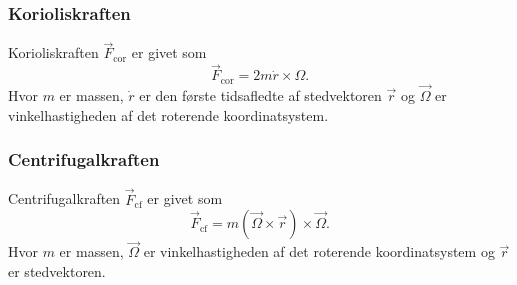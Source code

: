 \subsubsection{Korioliskraften}
Korioliskraften $\Vec{F}_{\text{cor}}$ er givet som
\[ 
\Vec{F}_{\text{cor}} = 2m \dot{r} \times \Omega
.\]
Hvor $m$ er massen, $\dot{r}$ er den første tidsafledte af stedvektoren $\Vec{r}$ og $\Vec{\Omega}$ er vinkelhastigheden af det roterende koordinatsystem.


\subsubsection{Centrifugalkraften}
Centrifugalkraften $\Vec{F}_{\text{cf}}$ er givet som
\[ 
\Vec{F}_{\text{cf}} = m(\Vec{\Omega} \times \Vec{r}) \times \Vec{\Omega}
.\]
Hvor $m$ er massen, $\Vec{\Omega}$ er vinkelhastigheden af det roterende koordinatsystem og $\Vec{r}$ er stedvektoren.
